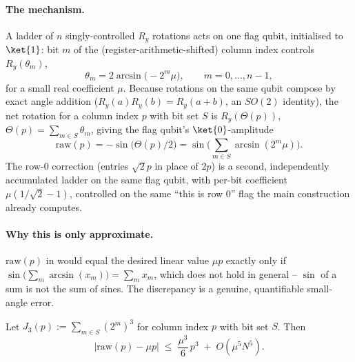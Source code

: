 \paragraph{The mechanism.} A ladder of $n$ singly-controlled $R_y$ rotations acts on
one flag qubit, initialised to $\ket{1}$: bit $m$ of the (register-arithmetic-shifted)
column index controls $R_y(\theta_m)$,
\begin{equation}
    \theta_m = 2\arcsin\!\big({-}2^m\mu\big), \qquad m = 0, \dots, n-1,
    \label{eq:app-ladder-primary}
\end{equation}
for a small real coefficient $\mu$. Because rotations on the same qubit compose by
exact angle addition ($R_y(a)R_y(b) = R_y(a+b)$, an $SO(2)$ identity), the net
rotation for a column index $p$ with bit set $S$ is $R_y(\Theta(p))$,
$\Theta(p) = \sum_{m \in S} \theta_m$, giving the flag qubit's $\ket{0}$-amplitude
\begin{equation}
    \mathrm{raw}(p) = -\sin\!\big(\Theta(p)/2\big) = \sin\!\Big(\textstyle\sum_{m \in S} \arcsin(2^m\mu)\Big).
    \label{eq:app-ladder-raw}
\end{equation}
The row-$0$ correction (entries $\sqrt{2}p$ in place of $2p$) is a second,
independently accumulated ladder on the same flag qubit, with per-bit coefficient
$\mu(1/\sqrt{2} - 1)$, controlled on the same ``this is row $0$'' flag the main
construction already computes.

\paragraph{Why this is only approximate.} $\mathrm{raw}(p)$ in 
would equal the desired linear value $\mu p$ exactly only if
$\sin\big(\sum_m \arcsin(x_m)\big) = \sum_m x_m$, which does not hold in general --
$\sin$ of a sum is not the sum of sines. The discrepancy is a genuine, quantifiable
small-angle error.

\begin{proposition}
\label{prop:epsilon-G}
Let $J_3(p) := \sum_{m \in S} (2^m)^3$ for column index $p$ with bit set $S$. Then
\begin{equation}
    \big|\mathrm{raw}(p) - \mu p\big| \;\le\; \frac{\mu^3}{6}\,p^3 \;+\; O(\mu^5 N^5).
    \label{eq:app-ladder-bound}
\end{equation}
\end{proposition}

